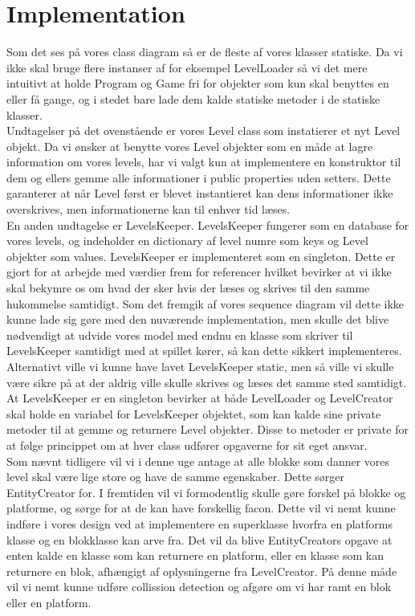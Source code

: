 \section{Implementation}
Som det ses på vores class diagram så er de fleste af vores klasser statiske. Da vi ikke skal bruge flere instanser af for eksempel LevelLoader så vi det mere intuitivt at holde Program og Game fri for objekter som kun skal benyttes en eller få gange, og i stedet bare lade dem kalde statiske metoder i de statiske klasser.\\
Undtagelser på det ovenstående er vores Level class som instatierer et nyt Level objekt. Da vi ønsker at benytte vores Level objekter som en måde at lagre information om vores levels, har vi valgt kun at implementere en konstruktor til dem og ellers gemme alle informationer i public properties uden setters. Dette garanterer at når Level først er blevet instantieret kan dens informationer ikke overskrives, men informationerne kan til enhver tid læses.\\
En anden undtagelse er LevelsKeeper. LevelsKeeper fungerer som en database for vores levels, og indeholder en dictionary af level numre som keys og Level objekter som values. LevelsKeeper er implementeret som en singleton. Dette er gjort for at arbejde med værdier frem for referencer hvilket bevirker at vi ikke skal bekymre os om hvad der sker hvis der læses og skrives til den samme hukommelse samtidigt. Som det fremgik af vores sequence diagram vil dette ikke kunne lade sig gøre med den nuværende implementation, men skulle det blive nødvendigt at udvide vores model med endnu en klasse som skriver til LevelsKeeper samtidigt med at spillet kører, så kan dette sikkert implementeres. Alternativt ville vi kunne have lavet LevelsKeeper static, men så ville vi skulle være sikre på at der aldrig ville skulle skrives og læses det samme sted samtidigt.\\
At LevelsKeeper er en singleton bevirker at både LevelLoader og LevelCreator skal holde en variabel for LevelsKeeper objektet, som kan kalde sine private metoder til at gemme og returnere Level objekter. Disse to metoder er private for at følge princippet om at hver class udfører opgaverne for sit eget ansvar.\\

Som nævnt tidligere vil vi i denne uge antage at alle blokke som danner vores level skal være lige store og have de samme egenskaber. Dette sørger EntityCreator for. I fremtiden vil vi formodentlig skulle gøre forskel på blokke og platforme, og sørge for at de kan have forskellig facon. Dette vil vi nemt kunne indføre i vores design ved at implementere en superklasse hvorfra en platforms klasse og en blokklasse kan arve fra. Det vil da blive EntityCreators opgave at enten kalde en klasse som kan returnere en platform, eller en klasse som kan returnere en blok, afhængigt af oplysningerne fra LevelCreator. På denne måde vil vi nemt kunne udføre collission detection og afgøre om vi har ramt en blok eller en platform. 
